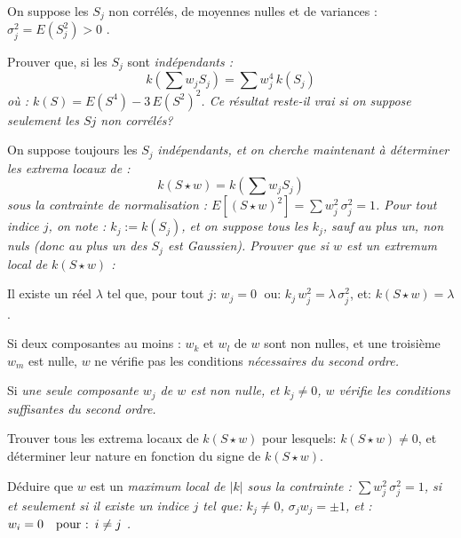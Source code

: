 \documentclass[12pt,a4paper,fleqn]{report}
\newcommand{\on}{\begin{displaymath}}
\newcommand{\off}{\end{displaymath}}
\newcommand{\push}[1]{\rule{0pt}{0pt}\hspace{#1pt}}
\begin{document}
\begin{exercice}
On suppose les $S_j$ non corrélés, de moyennes nulles et de variances :  $\sigma_j^2=E(S_j^2)>0$ .
\begin{questions}
\item  Prouver que, si les $S_j$ sont  \it indépendants \rm : 
\on k(\sum w_jS_j)=\sum w_j^4\, k(S_j) \off
où : $k(S)=E(S^4)-3\,E(S^2)^2$. Ce résultat reste-il vrai si on suppose seulement les $Sj$ non corrélés?
\item On suppose toujours les $S_j$ \it indépendants\rm, et on cherche maintenant à déterminer les extrema locaux de :  
\on k(S\star w)=k(\sum w_jS_j) \off
sous la contrainte de normalisation : $E[(S\star w)^2]=\sum w_j^2\,\sigma_j^2=1$.
Pour tout indice $j$, on note : $k_j:=k(S_j)$, et on suppose tous les $k_j$, \it sauf au plus un\rm, non nuls (donc au plus un des $S_j$ est Gaussien).  Prouver que si $w$ est un extremum local de $k(S\star w)$ : 
\begin{subquestions}
\item Il existe un réel $\lambda$ tel que, pour tout $j$:
$ w_j=0\;$  ou:  $ k_j\,w_j^2= \lambda\,\sigma_j^2 $, et:  $k(S\star w)=\lambda$.
\item  Si deux composantes  au moins  : $w_k$ et $w_l$ de $w$ sont  non nulles, et une troisième $w_m$ est nulle, $w$ ne vérifie pas les conditions  \it nécessaires \rm du second ordre.
\item  Si \it une seule \rm  composante $w_j$ de $w$ est non nulle, et $k_j\neq 0$, $w$ vérifie les conditions \it suffisantes \rm du second ordre.
\end{subquestions}
\item Trouver tous les extrema locaux de $k(S\star w)$ pour lesquels: $k(S\star w)\neq 0$, et déterminer  leur nature en fonction du signe de $k(S\star w)$.
\item Déduire que $w$ est un \it maximum \rm  local de $|k|$ sous la contrainte : $\sum w_j^2\,\sigma_j^2=1$, si et seulement si il existe un indice $j$ tel que:  $k_j\neq 0$,
$  \sigma_j w_j=\pm 1$, et : $w_i = 0\push{10}\mbox{pour :}\push 5 i\neq j $ . 
\end{questions}
\end{exercice}

\pagebreak
\end{document}
